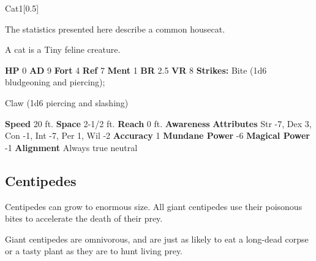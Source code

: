   
  \begin{monsection}{Cat}{1}[0.5]
    \vspace{-1em}\vspace{-1em}
    \vspace{0em}

    
      The statistics presented here describe a common housecat.
    
        A cat is a Tiny feline creature.
      

    \begin{spellcontent}
      \begin{spelltargetinginfo}
        \pari \textbf{HP} 0 \monsep
          \textbf{AD} 9 \monsep
          \textbf{Fort} 4 \monsep
          \textbf{Ref} 7 \monsep
          \textbf{Ment} 1
        \pari \textbf{BR} 2.5 \monsep
        \textbf{VR} 8
        \pari \textbf{Strikes:}
            Bite  (1d6 bludgeoning and piercing);
\par Claw  (1d6 piercing and slashing)
      \end{spelltargetinginfo}
    \end{spellcontent}
    \begin{monsterfooter}
      \pari \textbf{Speed} 20 ft. \monsep
        \textbf{Space} 2-1/2 ft. \monsep
        \textbf{Reach} 0 ft.
      \pari \textbf{Awareness} 
      \pari \textbf{Attributes}
        Str -7, Dex 3,
        Con -1, Int -7,
        Per 1, Wil -2
      \pari \textbf{Accuracy} 1 \monsep
        \textbf{Mundane Power} -6 \monsep
      \textbf{Magical Power} -1
      \pari \textbf{Alignment} Always true neutral
    \end{monsterfooter}
  \end{monsection}
  
  
    \subsection{Centipedes}
      
      Centipedes can grow to enormous size.
      All giant centipedes use their poisonous bites to accelerate the death of their prey.
    
      Giant centipedes are omnivorous, and are just as likely to eat a long-dead corpse or a tasty plant as they are to hunt living prey.
    

